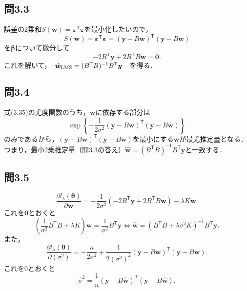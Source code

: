 \documentclass[pdflatex,ja=standard]{bxjsarticle}
\begin{document}
\subsection*{問3.3}
誤差の2乗和$S(\bm{w}) = \bm{\varepsilon}^{\mathsf{T}} \bm{\varepsilon}$を最小化したいので，
\begin{equation}
S(\bm{w}) = \bm{\varepsilon}^{\mathsf{T}} \bm{\varepsilon} = (\bm{y} - B \bm{w})^{\mathsf{T}} (\bm{y} - B \bm{w})
\end{equation}
を$\bm{\beta}$について微分して
\begin{equation}
- 2 B^{\mathsf{T}} \bm{y} + 2 B^{\mathsf{T}} B \bm{w} = \bm{0}. 
\end{equation}
これを解いて，　$\hat{\bm{w}}_{\rm{LMS}} = (B^{\mathsf{T}} B)^{-1} B^{\mathsf{T}} \bm{y}$　を得る．

\subsection*{問3.4}
式(3.35)の尤度関数のうち，$\bm{w}$に依存する部分は
\begin{equation}
\exp \left\{ -\frac{1}{2\sigma^2} (\bm{y} - B \bm{w})^{\mathsf{T}} (\bm{y} - B \bm{w}) \right\}
\end{equation}
のみであるから，$(\bm{y} - B \bm{w})^{\mathsf{T}} (\bm{y} - B \bm{w})$を最小にする$\bm{w}$が最尤推定量となる．つまり，最小2乗推定量（問3.3の答え）$\hat{\bm{w}} = (B^{\mathsf{T}} B)^{-1} B^{\mathsf{T}} \bm{y}$と一致する．

\subsection*{問3.5}
\begin{equation}
\frac{\partial l_{\lambda} (\bm{\theta}) }{\partial \bm{w}} = - \frac{1}{2 \sigma^2} ( -2 B^{\mathsf{T}} \bm{y} + 2 B^{\mathsf{T}} B \bm{w}) - \lambda K \bm{w}.
\end{equation}
これを$\bm{0}$とおくと
\begin{equation}
\left( \frac{1}{\sigma^2} B^{\mathsf{T}} B + \lambda K \right) \bm{w} = \frac{1}{\sigma^2} B^{\mathsf{T}} \bm{y}
\iff \hat{\bm{w}} = \left(B^{\mathsf{T}} B + \lambda \sigma^2  K \right)^{-1} B^{\mathsf{T}} \bm{y}.
\end{equation}
また，
\begin{equation}
\frac{\partial l_{\lambda} (\bm{\theta}) }{\partial (\sigma^2)} = - \frac{n}{2 \sigma^2} + \frac{1}{2 (\sigma^2)^2} (\bm{y} - B \bm{w})^{\mathsf{T}} (\bm{y} - B \bm{w}).
\end{equation}
これを0とおくと
\begin{equation}
\hat{\sigma}^2 = \frac{1}{n} (\bm{y} - B \hat{\bm{w}})^{\mathsf{T}} (\bm{y} - B \hat{\bm{w}}).
\end{equation}
\end{document}
